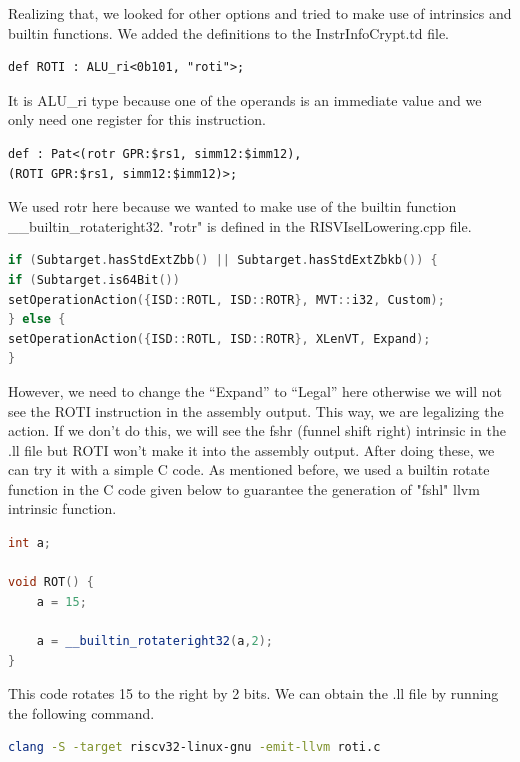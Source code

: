 Realizing that, we looked for other options and tried to make use of intrinsics and builtin functions. We added the definitions to the InstrInfoCrypt.td file.

\begin{lstlisting}
def ROTI : ALU_ri<0b101, "roti">;
\end{lstlisting}

It is ALU\_ri type because one of the operands is an immediate value and we only need one register for this instruction.

\begin{lstlisting}
def : Pat<(rotr GPR:$rs1, simm12:$imm12),
(ROTI GPR:$rs1, simm12:$imm12)>;
\end{lstlisting}

We used rotr here because we wanted to make use of the builtin function \_\_builtin\_rotateright32. "rotr" is defined in the RISVIselLowering.cpp file.

\begin{lstlisting}[language=C++]
if (Subtarget.hasStdExtZbb() || Subtarget.hasStdExtZbkb()) {
if (Subtarget.is64Bit())
setOperationAction({ISD::ROTL, ISD::ROTR}, MVT::i32, Custom);
} else {
setOperationAction({ISD::ROTL, ISD::ROTR}, XLenVT, Expand); 
}
\end{lstlisting}

However, we need to change the “Expand” to “Legal” here otherwise we will not see the ROTI instruction in the assembly output.  This way, we are legalizing the action. If we don’t do this, we will see the fshr (funnel shift right) intrinsic in the .ll file but ROTI won’t make it into the assembly output. After doing these, we can try it with a simple C code. As mentioned before, we used a builtin rotate function in the C code given below to guarantee the generation of "fshl" llvm intrinsic function. 

\begin{lstlisting}[language=C++]
int a;

void ROT() {
	a = 15;
	
	a = __builtin_rotateright32(a,2);	
}
\end{lstlisting}

This code rotates 15 to the right by 2 bits. We can obtain the .ll file by running the following command.

\begin{lstlisting}[language=Bash]
clang -S -target riscv32-linux-gnu -emit-llvm roti.c
\end{lstlisting}

